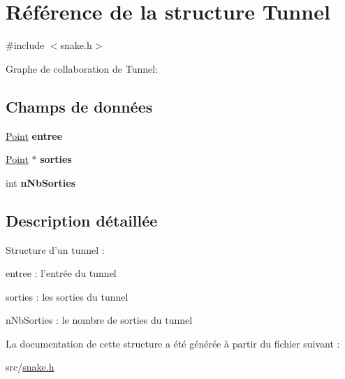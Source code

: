 \hypertarget{struct_tunnel}{\section{Référence de la structure Tunnel}
\label{struct_tunnel}
}


{\ttfamily \#include $<$snake.\-h$>$}



Graphe de collaboration de Tunnel\-:
\subsection*{Champs de données}
\begin{DoxyCompactItemize}
\item 
\hypertarget{struct_tunnel_a9e79e5f5fce3fbb06060627bdb4ac33a}{\hyperlink{struct_point}{Point} {\bfseries entree}}\label{struct_tunnel_a9e79e5f5fce3fbb06060627bdb4ac33a}

\item 
\hypertarget{struct_tunnel_a3cdb3ca4b41618eeee9846bbffcbb68c}{\hyperlink{struct_point}{Point} $\ast$ {\bfseries sorties}}\label{struct_tunnel_a3cdb3ca4b41618eeee9846bbffcbb68c}

\item 
\hypertarget{struct_tunnel_a2da1fff02f676a2338f5921a62515942}{int {\bfseries n\-Nb\-Sorties}}\label{struct_tunnel_a2da1fff02f676a2338f5921a62515942}

\end{DoxyCompactItemize}


\subsection{Description détaillée}
Structure d'un tunnel \-:
\begin{DoxyItemize}
\item entree \-: l'entrée du tunnel
\item sorties \-: les sorties du tunnel
\item n\-Nb\-Sorties \-: le nombre de sorties du tunnel 
\end{DoxyItemize}

La documentation de cette structure a été générée à partir du fichier suivant \-:\begin{DoxyCompactItemize}
\item 
src/\hyperlink{snake_8h}{snake.\-h}\end{DoxyCompactItemize}
